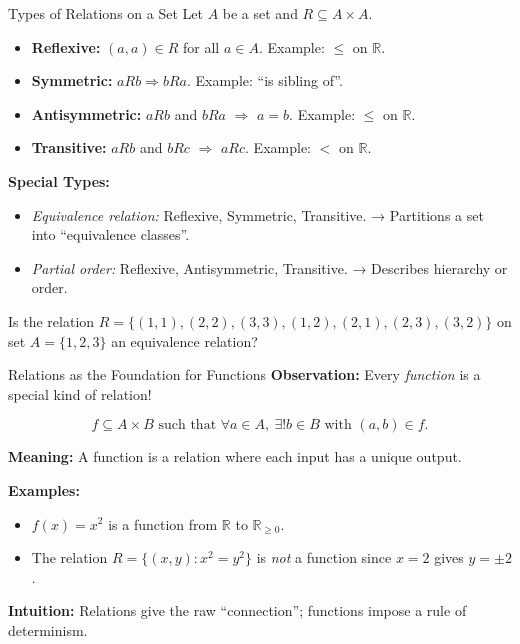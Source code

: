 \documentclass[11pt]{beamer}
\theoremstyle{plain}
\begin{document}
\begin{frame}{Types of Relations on a Set}
Let $A$ be a set and $R \subseteq A \times A$.

\begin{itemize}
    \item \textbf{Reflexive:} $(a,a) \in R$ for all $a \in A$.  
    Example: $\leq$ on $\mathbb{R}$.
    \item \textbf{Symmetric:} $aRb \Rightarrow bRa$.  
    Example: “is sibling of”.
    \item \textbf{Antisymmetric:} $aRb$ and $bRa$ $\Rightarrow$ $a=b$.  
    Example: $\leq$ on $\mathbb{R}$.
    \item \textbf{Transitive:} $aRb$ and $bRc$ $\Rightarrow$ $aRc$.  
    Example: $<$ on $\mathbb{R}$.
\end{itemize}

\medskip
\textbf{Special Types:}
\begin{itemize}
    \item \emph{Equivalence relation:} Reflexive, Symmetric, Transitive.  
    → Partitions a set into “equivalence classes”.
    \item \emph{Partial order:} Reflexive, Antisymmetric, Transitive.  
    → Describes hierarchy or order.
\end{itemize}
Is the relation $R = \{(1, 1), (2, 2), (3, 3), (1, 2), (2, 1), (2, 3), (3, 2)\}$ on set $A = \{1, 2, 3\}$ an equivalence relation?
\end{frame}


\begin{frame}{Relations as the Foundation for Functions}
\textbf{Observation:}
Every \emph{function} is a special kind of relation!

\[
f \subseteq A \times B \text{ such that } 
\forall a \in A, \ \exists! b \in B \text{ with } (a,b) \in f.
\]

\textbf{Meaning:}  
A function is a relation where each input has a unique output.

\medskip
\textbf{Examples:}
\begin{itemize}
    \item $f(x) = x^2$ is a function from $\mathbb{R}$ to $\mathbb{R}_{\ge 0}$.
    \item The relation $R = \{(x,y): x^2 = y^2\}$ is \emph{not} a function since $x=2$ gives $y=\pm 2$.
\end{itemize}

\medskip
\textbf{Intuition:}  
Relations give the raw “connection”; functions impose a rule of determinism.
\end{frame}
\end{document}
